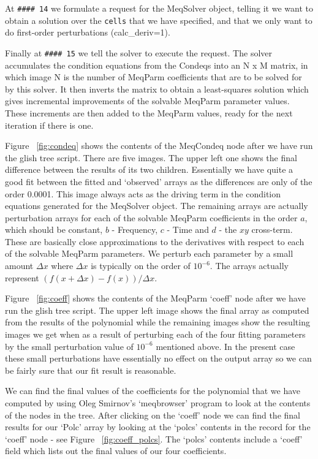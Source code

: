 \documentclass[10pt]{article}
\begin{document}
At {\tt \#\#\#\# 14} we formulate a request for the MeqSolver object,
telling it we want to obtain a solution over the {\tt cells} that
we have specified, and that we only want to do first-order
perturbations (calc\_deriv=1).

Finally at {\tt \#\#\#\# 15} we tell the solver to execute the
request. 
The solver accumulates the condition equations from the Condeqs into
an N x M matrix, in which image N is the number of MeqParm coefficients
that are to be solved for by this solver. It then inverts the matrix
to obtain a least-squares solution which gives incremental improvements of
the solvable MeqParm parameter values. These increments are then added to the
MeqParm values, ready for the next iteration if there is one.

Figure ~\ref{fig:condeq} shows the contents of the MeqCondeq
node after we have run the glish tree script. There are five
images. The upper left one shows the final difference between
the results of its two children. Essentially we have quite
a good fit between the fitted and `observed' arrays 
as the differences are only of the order 0.0001. This image
always acts as the driving term in the condition equations
generated for the MeqSolver object. The remaining arrays
are actually perturbation arrays for each of the solvable
MeqParm coefficients in the order $a$, which should be constant,
$b$ - Frequency, $c$ - Time and $d$ - the $xy$ cross-term. These
are basically close approximations to the derivatives with respect to
each of the solvable MeqParm parameters. We perturb each parameter
by a small amount $\Delta x$ where $\Delta x$ is typically on
the order of $10^{-6}$.
The arrays actually represent $ (f(x+\Delta x) -f(x))/\Delta x$.

Figure ~\ref{fig:coeff} shows the contents of the MeqParm `coeff'
node after we have run the glish tree script. The upper left image
shows the final array as computed from the results of the polynomial
while the remaining images show the resulting images we get when
as a result of perturbing each of the four fitting parameters by 
the small perturbation value of $10^{-6}$ mentioned above.
In the present case these small perturbations have essentially
no effect on the output array so we can be fairly sure that our
fit result is reasonable.
 
We can find the final values of the coefficients for the polynomial
that we have computed by using Oleg Smirnov's `meqbrowser' program to look at
the contents of the nodes in the tree. After clicking on the `coeff' node
we can find the final results for our `Polc' array by looking at the 
`polcs' contents in the record for the `coeff' node - see 
Figure  ~\ref{fig:coeff_polcs}. The `polcs' contents include a `coeff' field
which lists out the final values of our four coefficients. 
\end{document}
